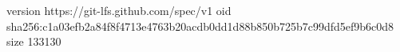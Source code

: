 version https://git-lfs.github.com/spec/v1
oid sha256:c1a03efb2a84f8f4713e4763b20acdb0dd1d88b850b725b7c99dfd5ef9b6c0d8
size 133130
